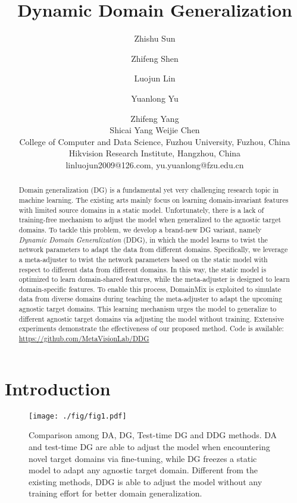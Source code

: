 \documentclass{article}
\title{Dynamic Domain Generalization}
\author{
Zhishu Sun\and
Zhifeng Shen\and
Luojun Lin\footnotemark[2]\and
Yuanlong Yu\footnotemark[2]\and
Zhifeng Yang \\
Shicai Yang\And
Weijie Chen \\
\affiliations
College of Computer and Data Science, Fuzhou University, Fuzhou, China\\
Hikvision Research Institute, Hangzhou, China\\
\emails
linluojun2009@126.com, 
yu.yuanlong@fzu.edu.cn
}
\begin{document}
\maketitle
\renewcommand{\thefootnote}{\fnsymbol{footnote}}
\renewcommand{\thefootnote}{\arabic{footnote}}

\begin{abstract}
Domain generalization (DG) is a fundamental yet very challenging research topic in machine learning. The existing arts mainly focus on learning domain-invariant features with limited source domains in a static model. Unfortunately, there is a lack of training-free mechanism to adjust the model when generalized to the agnostic target domains. To tackle this problem, we develop a brand-new DG variant, namely \emph{Dynamic Domain Generalization} (DDG), in which the model learns to twist the network parameters to adapt the data from different domains. Specifically, we leverage a meta-adjuster to twist the network parameters based on the static model with respect to different data from different domains. In this way, the static model is optimized to learn domain-shared features, while the meta-adjuster is designed to learn domain-specific features. To enable this process, DomainMix is exploited to simulate data from diverse domains during teaching the meta-adjuster to adapt the upcoming agnostic target domains. This learning mechanism urges the model to generalize to different agnostic target domains via adjusting the model without training. Extensive experiments demonstrate the effectiveness of our proposed method. {Code is available: {\color{cyan}\url{https://github.com/MetaVisionLab/DDG}}}
\end{abstract}

\section{Introduction}

\begin{figure}[t]
     \centering
     \footnotesize
     \vspace{-0.2cm}
     \texttt{[image: ./fig/fig1.pdf]}
     \vspace{-0.2cm}
     \caption{Comparison among DA, DG, Test-time DG and DDG methods. DA and test-time DG are able to adjust the model when encountering novel target domains via fine-tuning, while DG freezes a static model to adapt any agnostic target domain. Different from the existing methods, DDG is able to adjust the model without any training effort for better domain generalization.}
     \label{fig:ddg}
     \vspace{-0.2cm}
\end{figure}
\end{document}
